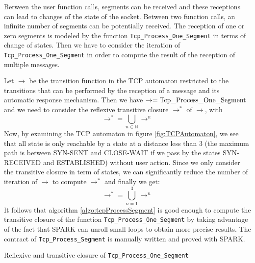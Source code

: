 \documentclass[a4paper, 10pt]{article}
\let\state\textsf
\newcommand\ESTABLISHED{\state{ESTABLISHED}}
\newcommand\SYNRECEIVED{\state{SYN-RECEIVED}}
\newcommand\CLOSEWAIT{\state{CLOSE-WAIT}}
\newcommand\SYNSENT{\state{SYN-SENT}}
\begin{document}
    Between the user function calls, segments can be received and these receptions can lead to
    changes of the state of the socket. Between two function calls, an infinite number of segments
    can be potentially received. The reception of one or zero segments is modeled by the function
    \lstinline[language=Ada]{Tcp_Process_One_Segment} in terms of change of states. Then we have
    to consider the iteration of \lstinline[language=Ada]{Tcp_Process_One_Segment} in order to
    compute the result of the reception of multiple messages.

    Let $\rightarrow$ be the transition function in the TCP automaton restricted to the transitions
    that can be performed by the reception of a message and its automatic response mechanism.
    Then we have $\rightarrow = \text{\lstinline[language=Ada]{Tcp_Process_One_Segment}}$ and
    we need to consider the reflexive transitive closure $\rightarrow^*$ of $\rightarrow$, with
    \[\rightarrow^* = \bigcup_{n\in\mathbb{N}} \rightarrow^n\]
    Now, by examining the TCP automaton in figure \ref{fig:TCPAutomaton}, we see that all state is
    only reachable by a state at a distance less than 3 (the maximum path is between \SYNSENT{} and
    \CLOSEWAIT{} if we pass by the states \SYNRECEIVED{} and \ESTABLISHED{}) without user action. Since
    we only consider the transitive closure in term of states, we can significantly reduce the number
    of iteration of $\rightarrow$ to compute $\rightarrow^*$ and finally we get:
    \[\rightarrow^* = \bigcup_{n=1}^3 \rightarrow^n\]
    It follows that algorithm \ref{algo:tcpProcessSegment} is good enough to compute the transitive closure of the function
    \lstinline[language=Ada]{Tcp_Process_One_Segment} by taking advantage of the fact that SPARK can unroll
    small loops to obtain more precise results. The contract of \lstinline[language=Ada]{Tcp_Process_Segment} is
    manually written and proved with SPARK.

    \begin{algorithm}[t]
        \caption{Reflexive and transitive closure of \lstinline[language=Ada]{Tcp_Process_One_Segment}}
        \label{algo:tcpProcessSegment}
    \end{algorithm}
\end{document}
